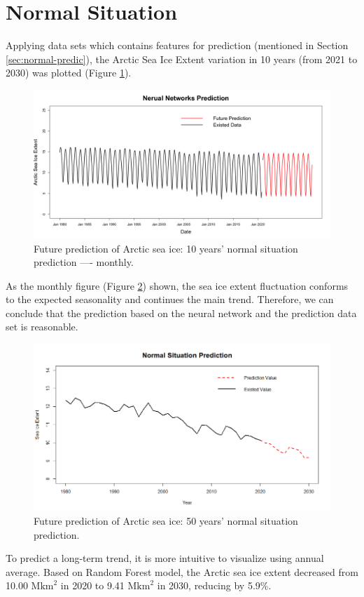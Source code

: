 \section{Normal Situation} %

Applying data sets which contains features for prediction (mentioned in Section \ref{sec:normal-predic}), the Arctic Sea Ice Extent variation in 10 years (from 2021 to 2030) was plotted (Figure \ref{4.3.1-10yrs}).

\begin{figure}[htbp]
\centering
\includegraphics[width = 1.0\textwidth]{Figure/4.3.1-10yrs.png}
\caption{Future prediction of Arctic sea ice: 10 years' normal situation prediction ---- monthly.}
\label{4.3.1-10yrs}
\end{figure}


As the monthly figure (Figure \ref{4.3.1-Normal-Prediction}) shown, the sea ice extent fluctuation conforms to the expected seasonality and continues the main trend. Therefore, we can conclude that the prediction based on the neural network and the prediction data set is reasonable.

\begin{figure}[htbp]
\centering
\includegraphics[width = 1.0\textwidth]{Figure/4.3.1-Normal-Prediction.png}
\caption{Future prediction of Arctic sea ice: 50 years' normal situation prediction.}
\label{4.3.1-Normal-Prediction}
\end{figure}

To predict a long-term trend, it is more intuitive to visualize using annual average. Based on Random Forest model, the Arctic sea ice extent decreased from 10.00 $\text{Mkm}^2$ in 2020 to 9.41 $\text{Mkm}^2$ in 2030, reducing by 5.9\%.

\newpage